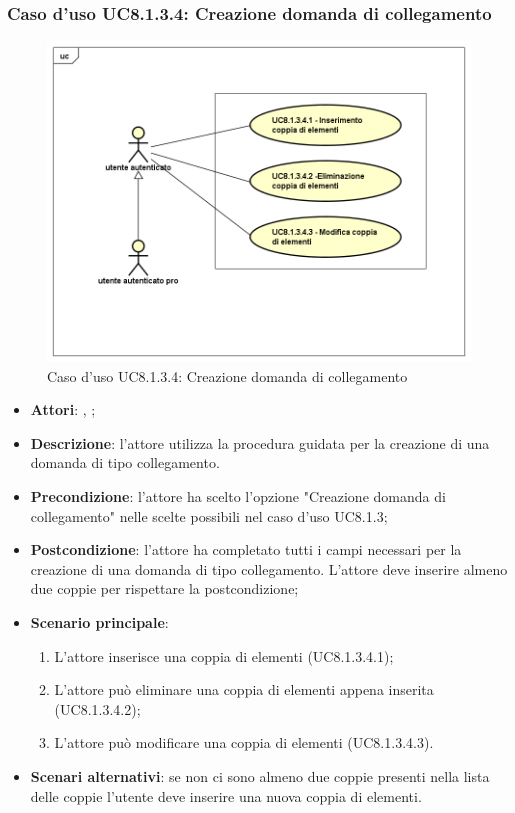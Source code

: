 \subsubsection{Caso d'uso UC8.1.3.4: Creazione domanda di collegamento}
\label{UC8.1.3.4}
\begin{figure}[h]
	\centering
\includegraphics[scale=0.5,keepaspectratio]{UML/UC8_1_3_4.png}
	\caption{Caso d'uso UC8.1.3.4: Creazione domanda di collegamento}
\end{figure}
\FloatBarrier
\begin{itemize}
	\item \textbf{Attori}: \uau, \uaupro;
	\item \textbf{Descrizione}: l'attore utilizza la procedura guidata per la creazione di una domanda di tipo collegamento. 
	\item \textbf{Precondizione}: l'attore ha scelto l'opzione "Creazione domanda di collegamento" nelle scelte possibili nel caso d'uso UC8.1.3;
	\item \textbf{Postcondizione}: l'attore ha completato tutti i campi necessari per la creazione di una domanda di tipo collegamento. L'attore deve inserire almeno due coppie per rispettare la postcondizione;
	\item \textbf{Scenario principale}: 
		\begin{enumerate}
			\item L'attore inserisce una coppia di elementi (UC8.1.3.4.1);
			\item L'attore può eliminare una coppia di elementi appena inserita (UC8.1.3.4.2);
			\item L'attore può modificare una coppia di elementi (UC8.1.3.4.3).
		\end{enumerate}
	\item \textbf{Scenari alternativi}: se non ci sono almeno due coppie presenti nella lista delle coppie l'utente deve inserire una nuova coppia di elementi.
\end{itemize}

